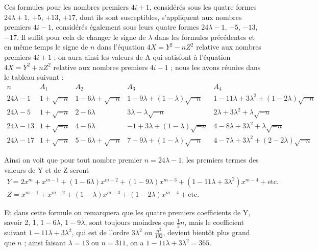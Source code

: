 \documentclass[11pt,a4paper]{article}
\begin{document}
Ces formules pour les nombres premiers $4i + 1$, considérés sous les quatre
formes $24\lambda + 1$, $+5$, $+13$, $+17$, dont ils sont susceptibles,
s'appliquent aux nombres premiers $4i - 1$, considérés également sous leurs
quatre formes $24\lambda - 1$, $-5$, $-13$, $-17$. Il suffit pour cela de
changer le signe de $\lambda$ dans les formules précédentes et en même temps
le signe de $n$ dans l'équation $4X = Y^2 - nZ^2$ relative aux nombres
premiers $4i + 1$ ; on aura ainsi les valeurs de A qui satisfont à
l'équation $4X = Y^2 + nZ^2$ relative aux nombres premiers $4i - 1$ ; nous
les avons réunies dans le tableau suivant :
\[
\begin{array}{c|c|c|c|c}
n & A_1 & A_2 & A_3 & A_4 \\ \hline
24\lambda - 1 & 1 + \sqrt{-n} & 1 - 6\lambda + \sqrt{-n} & 1 - 9\lambda + (1 - \lambda)\sqrt{-n} & 1 -\! 11\lambda +\! 3\lambda^2 +\! (1 -\! 2\lambda)\sqrt{-n} \\
24\lambda - 5 & 1 + \sqrt{-n} & 2 - 6\lambda & 3\lambda - \lambda\sqrt{-n} & 2\lambda + 3\lambda^2 + \lambda\sqrt{-n} \\
24\lambda - 13 & 1 + \sqrt{-n} & 4 - 6\lambda & -1 + 3\lambda + (1 - \lambda)\sqrt{-n} & 4 - 8\lambda + 3\lambda^2 + \lambda\sqrt{-n} \\
24\lambda - 17 & 1 + \sqrt{-n} & 5 - 6\lambda + \sqrt{-n} & 7 - 9\lambda + (1 - \lambda)\sqrt{-n} & 4 -\! 7\lambda +\! 3\lambda^2 +\! (2 -\! 2\lambda)\sqrt{-n}
\end{array}
\]

Ainsi on voit que pour tout nombre premier $n = 24\lambda - 1$, les premiers
termes des valeurs de Y et de Z seront
\[
\begin{array}{l}
Y = 2x^m + x^{m-1} + (1 - 6\lambda)x^{m-2} + (1 - 9\lambda)x^{m-3} + (1 - 11\lambda + 3\lambda^2)x^{m-4} + \text{etc.} \\
Z = x^{m-1} + x^{m-2} + (1 - \lambda)x^{m-3} + (1 - 2\lambda)x^{m-4} + \text{etc.}
\end{array}
\]


Et dans cette formule on remarquera que les quatre premiers coefficients de
Y, savoir 2, 1, $1 - 6\lambda$, $1 - 9\lambda$, sont toujours moindres que
$\frac{1}{2}n$, mais le coefficient suivant $1 - 11\lambda + 3\lambda^2$, qui
est de l'ordre $3\lambda^2$ ou $\frac{n^2}{192}$, devient bientôt plus grand
que $n$ ; ainsi faisant $\lambda = 13$ ou $n = 311$, on a
$1 - 11\lambda + 3\lambda^2 = 365$.
\end{document}
